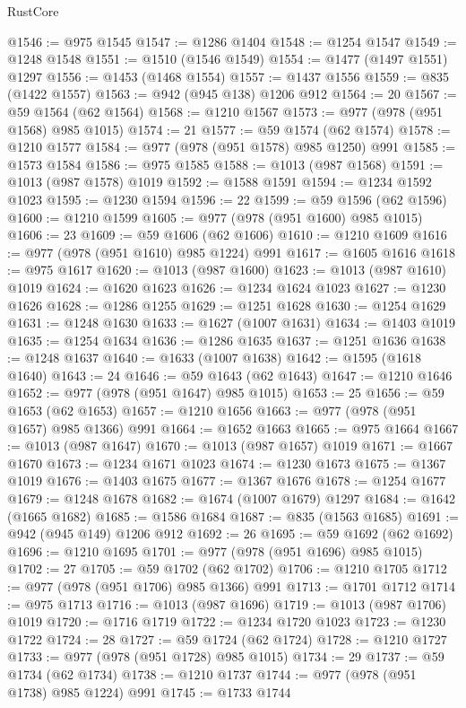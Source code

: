\begin{lexlean}{RustCore}
\begin{coremodule}
@1546 := @975 @1545
@1547 := @1286 @1404
@1548 := @1254 @1547
@1549 := @1248 @1548
@1551 := @1510 (@1546 @1549)
@1554 := @1477 (@1497 @1551) @1297
@1556 := @1453 (@1468 @1554)
@1557 := @1437 @1556
@1559 := @835 (@1422 @1557)
@1563 := @942 (@945 @138) @1206 @912
@1564 := 20
@1567 := @59 @1564 (@62 @1564)
@1568 := @1210 @1567
@1573 := @977 (@978 (@951 @1568) @985 @1015)
@1574 := 21
@1577 := @59 @1574 (@62 @1574)
@1578 := @1210 @1577
@1584 := @977 (@978 (@951 @1578) @985 @1250) @991
@1585 := @1573 @1584
@1586 := @975 @1585
@1588 := @1013 (@987 @1568)
@1591 := @1013 (@987 @1578) @1019
@1592 := @1588 @1591
@1594 := @1234 @1592 @1023
@1595 := @1230 @1594
@1596 := 22
@1599 := @59 @1596 (@62 @1596)
@1600 := @1210 @1599
@1605 := @977 (@978 (@951 @1600) @985 @1015)
@1606 := 23
@1609 := @59 @1606 (@62 @1606)
@1610 := @1210 @1609
@1616 := @977 (@978 (@951 @1610) @985 @1224) @991
@1617 := @1605 @1616
@1618 := @975 @1617
@1620 := @1013 (@987 @1600)
@1623 := @1013 (@987 @1610) @1019
@1624 := @1620 @1623
@1626 := @1234 @1624 @1023
@1627 := @1230 @1626
@1628 := @1286 @1255
@1629 := @1251 @1628
@1630 := @1254 @1629
@1631 := @1248 @1630
@1633 := @1627 (@1007 @1631)
@1634 := @1403 @1019
@1635 := @1254 @1634
@1636 := @1286 @1635
@1637 := @1251 @1636
@1638 := @1248 @1637
@1640 := @1633 (@1007 @1638)
@1642 := @1595 (@1618 @1640)
@1643 := 24
@1646 := @59 @1643 (@62 @1643)
@1647 := @1210 @1646
@1652 := @977 (@978 (@951 @1647) @985 @1015)
@1653 := 25
@1656 := @59 @1653 (@62 @1653)
@1657 := @1210 @1656
@1663 := @977 (@978 (@951 @1657) @985 @1366) @991
@1664 := @1652 @1663
@1665 := @975 @1664
@1667 := @1013 (@987 @1647)
@1670 := @1013 (@987 @1657) @1019
@1671 := @1667 @1670
@1673 := @1234 @1671 @1023
@1674 := @1230 @1673
@1675 := @1367 @1019
@1676 := @1403 @1675
@1677 := @1367 @1676
@1678 := @1254 @1677
@1679 := @1248 @1678
@1682 := @1674 (@1007 @1679) @1297
@1684 := @1642 (@1665 @1682)
@1685 := @1586 @1684
@1687 := @835 (@1563 @1685)
@1691 := @942 (@945 @149) @1206 @912
@1692 := 26
@1695 := @59 @1692 (@62 @1692)
@1696 := @1210 @1695
@1701 := @977 (@978 (@951 @1696) @985 @1015)
@1702 := 27
@1705 := @59 @1702 (@62 @1702)
@1706 := @1210 @1705
@1712 := @977 (@978 (@951 @1706) @985 @1366) @991
@1713 := @1701 @1712
@1714 := @975 @1713
@1716 := @1013 (@987 @1696)
@1719 := @1013 (@987 @1706) @1019
@1720 := @1716 @1719
@1722 := @1234 @1720 @1023
@1723 := @1230 @1722
@1724 := 28
@1727 := @59 @1724 (@62 @1724)
@1728 := @1210 @1727
@1733 := @977 (@978 (@951 @1728) @985 @1015)
@1734 := 29
@1737 := @59 @1734 (@62 @1734)
@1738 := @1210 @1737
@1744 := @977 (@978 (@951 @1738) @985 @1224) @991
@1745 := @1733 @1744

\end{coremodule}
\end{lexlean}

